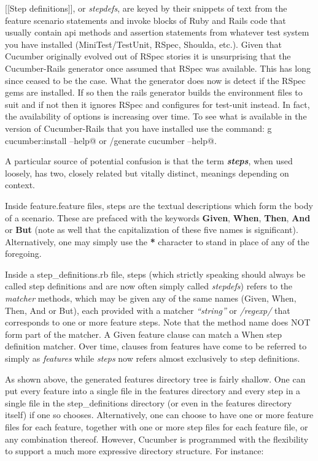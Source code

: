 [[Step definitions]], or \emph{stepdefs}, are keyed by their snippets of text from the feature scenario statements and invoke blocks of Ruby and Rails code that usually contain api methods and assertion statements from whatever test system you have installed (MiniTest/TestUnit, RSpec, Shoulda, etc.).  Given that Cucumber originally evolved out of RSpec stories it is unsurprising that the Cucumber-Rails generator once assumed that RSpec was available.  This has long since ceased to be the case.  What the generator does now is detect if the RSpec gems are installed.  If so then the rails generator builds the environment files to suit and if not then it ignores RSpec and configures for test-unit instead.  In fact, the availability of options is increasing over time.  To see what is available in the version of Cucumber-Rails that you have installed use the command: \verb@rails g cucumber:install --help@ or \verb@script/generate cucumber --help@.

A particular source of potential confusion is that the term \emph{\textbf{steps}}, when used loosely, has two, closely related but vitally distinct, meanings depending on context.

Inside feature.feature files, steps are the textual descriptions which form the body of a scenario.  These are prefaced with the keywords \textbf{Given}, \textbf{When}, \textbf{Then}, \textbf{And} or \textbf{But} (note as well that the capitalization of these five names is significant).  Alternatively, one may simply use the \textbf{*} character to stand in place of any of the foregoing.

Inside a step\_definitions.rb file, steps (which strictly speaking should always be called step definitions and are now often simply called \emph{stepdefs}) refers to the \emph{matcher} methods, which may be given any of the same names (Given, When, Then, And or But), each provided with a matcher \emph{``string''} or \emph{/regexp/} that corresponds to one or more feature steps.  Note that the method name does NOT form part of the matcher.  A Given feature clause can match a When step definition matcher.  Over time, clauses from features have come to be referred to simply as \emph{features} while \emph{steps} now refers almost exclusively to step definitions.

As shown above, the generated features directory tree is fairly shallow.  One can put every feature into a single file in the features directory and every step in a single file in the step\_definitions directory (or even in the features directory itself) if one so chooses.  Alternatively, one can choose to have one or more feature files for each feature, together with one or more step files for each feature file, or any combination thereof.  However, Cucumber is programmed with the flexibility to support a much more expressive directory structure.  For instance:

